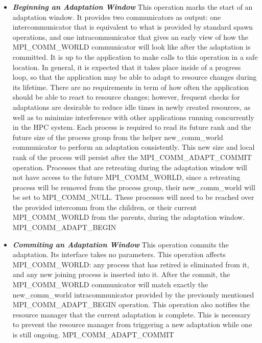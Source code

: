 \begin{itemize}
\item \textbf{\textit{Beginning an Adaptation Window}} This operation marks the start of an adaptation window. It provides two communicators as output: one intercommunicator that is equivalent to what is provided by standard spawn operations, and one intracommunicator that gives an early view of how the MPI{\_}COMM{\_}WORLD communicator will look like after the adaptation is committed. It is up to the application to make calls to this operation in a safe location. In general, it is expected that it takes place inside of a progress loop, so that the application may be able to adapt to resource changes during its lifetime. There are no requirements in term of how often the application should be able to react to resource changes; however, frequent checks for adaptations are desirable to reduce idle times in newly created resources, as well as to minimize interference with other applications running concurrently in the HPC system. Each process is required to read its future rank and the future 
 size of the process group from the helper new{\_}comm{\_}world communicator to perform an adaptation consistently. This new size and local rank of the process will persist after the MPI{\_}COMM{\_}ADAPT{\_}COMMIT operation. Processes that are retreating during the adaptation window
will not have access to the future MPI{\_}COMM{\_}WORLD, since a retreating process will be removed from the process group, their new{\_}comm{\_}world will be set to MPI{\_}COMM{\_}NULL. These processes will need to be reached over the provided intercomm from the children, or their current MPI{\_}COMM{\_}WORLD from the parents, during the adaptation window. MPI{\_}COMM{\_}ADAPT{\_}BEGIN
\item \textbf{\textit{Commiting an Adaptation Window}} This operation commits the adaptation. Its interface takes no parameters. This operation affects MPI{\_}COMM{\_}WORLD: any process that has retired is eliminated from it, and any new joining process is inserted into it. After the commit, the MPI{\_}COMM{\_}WORLD communicator will match exactly the new{\_}comm{\_}world intracommunicator provided by the previously mentioned MPI{\_}COMM{\_}ADAPT{\_}BEGIN operation. This operation also notifies the resource manager that the current adaptation is complete. This is necessary to prevent the resource manager from triggering a new adaptation while one is still ongoing.  MPI{\_}COMM{\_}ADAPT{\_}COMMIT
\end{itemize}

